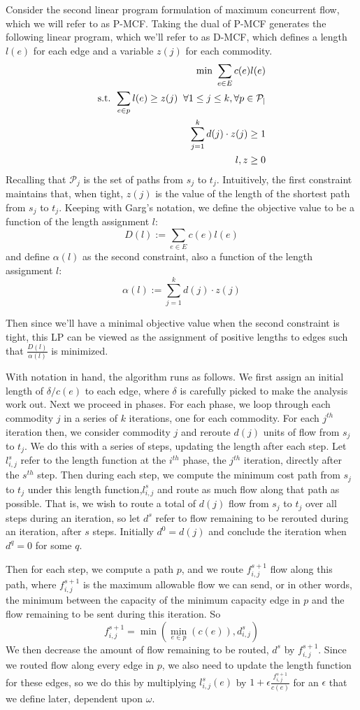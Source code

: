 Consider the second linear program formulation of maximum
concurrent flow, which we will refer to as P-MCF. Taking the dual of
P-MCF generates the following linear program, which we'll refer to as D-MCF, which defines a length
$l(e)$ for each edge and a variable $z(j)$ for each commodity.
\begin{align*}
\text{min     } \sum_{e\in E}c(e)l(e) \\
\text{s.t. }\sum_{e\in p}l(e) \geq z(j) \;\;\forall 1\leq j \leq k,
\forall p \in \cal{P}_j\\
\sum_{j=1}^kd(j)\cdot z(j)\geq 1\\
l,z\geq 0
\end{align*}
Recalling that $\mathcal{P}_j$ is the set of paths from $s_j$ to
$t_j$. Intuitively, the first constraint maintains that, when tight, $z(j)$ is the
value of the length of the shortest path from $s_j$ to $t_j$. Keeping
with Garg's notation, we define the objective value to be a function
of the length assignment $l$:
$$D(l) := \sum_{e\in E} c(e)l(e)$$
and define $\alpha(l)$ as the second constraint, also a function of the length assignment $l$:
$$\alpha(l) := \sum_{j=1}^k d(j)\cdot z(j)$$

Then since we'll have a minimal objective value when the second
constraint is tight, this LP can be viewed as the assignment of
positive lengths to edges such that $\frac{D(l)}{\alpha(l)}$ is
minimized. 

With notation in hand, the algorithm runs as follows. We first assign
an initial length of $\delta/c(e)$ to each edge, where $\delta$ is carefully picked
to make the analysis work out. Next we proceed in phases. For each
phase, we loop through each commodity $j$ in a series of $k$
iterations, one for each commodity. For each $j^{th}$ iteration then, we
consider commodity $j$ and reroute $d(j)$ units of flow from $s_j$ to
$t_j$. We do this with a series of steps, updating the length after each step. Let $l_{i,j}^s$ refer to the
length function at the $i^{th}$ phase, the $j^{th}$ iteration,
directly after the $s^{th}$ step. Then during each step, we compute the minimum cost
path from $s_j$ to $t_j$ under this length function,$l_{i,j}^s$ and route as much
flow along that path as possible. That is, we wish to route a total of
$d(j)$ flow from $s_j$ to $t_j$ over all steps during an iteration, so
let $d^s$ refer to flow remaining to be rerouted during an
iteration, after $s$ steps. Initially $d^0=d(j)$ and conclude the
iteration when $d^q=0$ for some $q$. 

Then for each step, we compute a path $p$,
and we route $f_{i,j}^{s+1}$ flow along this path, where
$f_{i,j}^{s+1}$ is the maximum allowable flow we can send, or in other
words, the minimum between the capacity of the minimum capacity edge
in $p$ and the flow remaining to be sent during this iteration. So
$$f_{i,j}^{s+1}=\min(\min_{e\in p}(c(e)),d_{i,j}^s)$$
We then decrease the amount of flow remaining to be routed, $d^s$ by
$f_{i,j}^{s+1}$. Since we routed flow along every edge in $p$, we also
need to update the length function for these edges, so we do this by
multiplying $l_{i,j}^s(e)$ by $1+\epsilon \frac{f_{i,j}^{s+1}}{c(e)}$ for an
$\epsilon$ that we define later, dependent upon $\omega$. 

